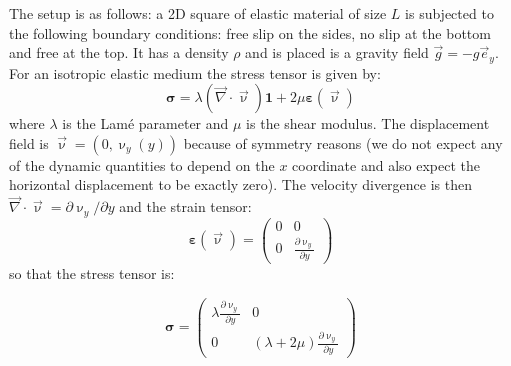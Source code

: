 The setup is as follows: a 2D square of elastic material of size $L$ is 
subjected to the following boundary conditions: free slip on the sides, no slip at the 
bottom and free at the top. It has a density $\rho$ and is placed is a gravity 
field ${\vec g}=-g {\vec e}_y$.
For an isotropic elastic medium the stress tensor is given by:
\[
{\bm \sigma} = \lambda ({\vec \nabla}\cdot{\vec \upnu}) {\bm 1} + 2 \mu {\bm \varepsilon}(\vec\upnu)
\]
where $\lambda$ is the Lam{\'e} parameter and $\mu$ is the shear modulus.
The displacement field is ${\vec \upnu}=(0,\upnu_y(y))$ because of symmetry reasons 
(we do not expect any of the dynamic quantities to depend on the $x$ coordinate and 
also expect the horizontal displacement to be exactly zero).
The velocity divergence is then ${\vec \nabla}\cdot{\vec \upnu} = \partial \upnu_y/\partial y$
and the strain tensor:
\[
{\bm \varepsilon}(\vec \upnu)
=
\left(
\begin{array}{cc}
0 & 0 \\
0 & \frac{\partial \upnu_y}{\partial y}
\end{array}
\right)
\]
so that the stress tensor is:

\[
{\bm \sigma} =
\left(
\begin{array}{cc}
\lambda \frac{\partial \upnu_y}{\partial y} &  0 \\
0 & (\lambda + 2 \mu) \frac{\partial \upnu_y}{\partial y}
\end{array}
\right)
\]

